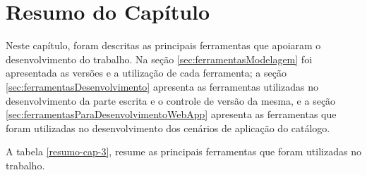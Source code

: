 \section{Resumo do Capítulo}

Neste capítulo, foram descritas as principais ferramentas que apoiaram o desenvolvimento do trabalho. Na seção \ref{sec:ferramentasModelagem} foi apresentada as versões e a utilização de cada ferramenta; a seção \ref{sec:ferramentasDesenvolvimento} apresenta as ferramentas utilizadas no desenvolvimento da parte escrita e o controle de versão da mesma, e a seção \ref{sec:ferramentasParaDesenvolvimentoWebApp} apresenta as ferramentas que foram utilizadas no desenvolvimento dos cenários de aplicação do catálogo. 

A tabela \ref{resumo-cap-3}, resume as principais ferramentas que foram utilizadas no trabalho.

